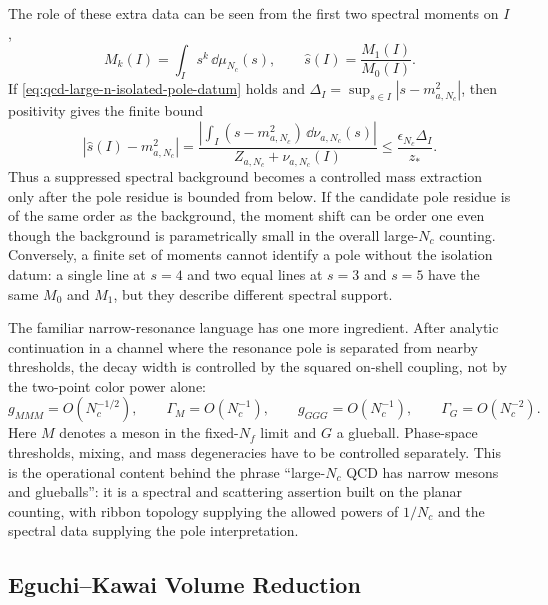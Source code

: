 \begin{controlledapproximation}
The role of these extra data can be seen from the first two spectral moments
on \(I\),
\[
  M_k(I)=\int_I s^k\,\dd\mu_{N_c}(s),
  \qquad
  \widehat s(I)=\frac{M_1(I)}{M_0(I)} .
\]
If \eqref{eq:qcd-large-n-isolated-pole-datum} holds and
\(\Delta_I=\sup_{s\in I}|s-m_{a,N_c}^2|\), then positivity gives the finite
bound
\begin{equation}
  \left|
  \widehat s(I)-m_{a,N_c}^2
  \right|
  =
  \frac{\left|\int_I(s-m_{a,N_c}^2)\,\dd\nu_{a,N_c}(s)\right|}
       {Z_{a,N_c}+\nu_{a,N_c}(I)}
  \le
  \frac{\epsilon_{N_c}\Delta_I}{z_*}.
  \label{eq:qcd-large-n-pole-moment-bound}
\end{equation}
Thus a suppressed spectral background becomes a controlled mass extraction
only after the pole residue is bounded from below.  If the candidate pole
residue is of the same order as the background, the moment shift can be
order one even though the background is parametrically small in the overall
large-\(N_c\) counting.  Conversely, a finite set of moments cannot identify a
pole without the isolation datum: a single line at \(s=4\) and two equal lines
at \(s=3\) and \(s=5\) have the same \(M_0\) and \(M_1\), but they describe
different spectral support.

The familiar narrow-resonance language has one more ingredient.  After
analytic continuation in a channel where the resonance pole is separated from
nearby thresholds, the decay width is controlled by the squared on-shell
coupling, not by the two-point color power alone:
\begin{equation}
  g_{MMM}=O(N_c^{-1/2}),\qquad
  \Gamma_M=O(N_c^{-1}),
  \qquad
  g_{GGG}=O(N_c^{-1}),\qquad
  \Gamma_G=O(N_c^{-2}).
  \label{eq:qcd-large-n-width-scaling}
\end{equation}
Here \(M\) denotes a meson in the fixed-\(N_f\) limit and \(G\) a glueball.
Phase-space thresholds, mixing, and mass degeneracies have to be controlled
separately.  This is the operational content behind the phrase ``large-\(N_c\)
QCD has narrow mesons and glueballs'': it is a spectral and scattering
assertion built on the planar counting, with ribbon topology supplying the
allowed powers of \(1/N_c\) and the spectral data supplying the pole
interpretation.
\end{controlledapproximation}

\subsection{Eguchi--Kawai Volume Reduction}
\label{subsec:qcd-eguchi-kawai-volume-reduction}

